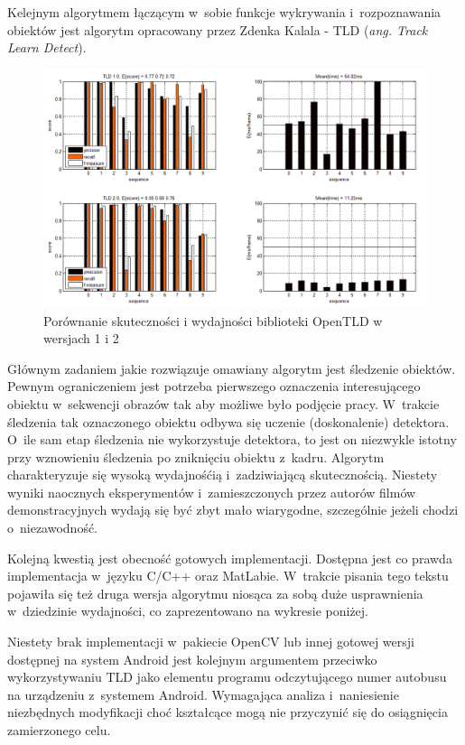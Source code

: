 Kelejnym algorytmem łączącym w~sobie funkcje wykrywania
i~rozpoznawania obiektów jest algorytm opracowany przez
Zdenka Kalala \cite{DBLP:journals/pami/KalalMM12} - TLD (\textit{ang.
Track Learn Detect}).

\begin{figure}[h!]
    \centering
    \includegraphics[width=1\textwidth]{img/rev_open_tld_1_2_comparison}
    \caption{Porównanie skuteczności i wydajności biblioteki OpenTLD w wersjach 1 i 2}
\end{figure}

Głównym zadaniem jakie rozwiązuje omawiany algorytm jest śledzenie obiektów.
Pewnym ograniczeniem jest potrzeba pierwszego oznaczenia interesującego
obiektu w~sekwencji obrazów tak aby możliwe było podjęcie pracy.
W~trakcie śledzenia tak oznaczonego obiektu odbywa się uczenie (doskonalenie)
detektora. O~ile sam etap śledzenia nie wykorzystuje detektora, to jest on
niezwykle istotny przy wznowieniu śledzenia po zniknięciu obiektu z~kadru.
Algorytm charakteryzuje się wysoką wydajnośćią i~zadziwiającą skutecznością.
Niestety wyniki naocznych eksperymentów i~zamieszczonych przez autorów filmów
demonstracyjnych wydają się być zbyt mało wiarygodne, szczególnie jeżeli
chodzi o~niezawodność.

Kolejną kwestią jest obecność gotowych implementacji.
Dostępna jest co prawda implementacja w~języku C/C++ oraz MatLabie. W~trakcie
pisania tego tekstu pojawiła się też druga wersja algorytmu niosąca
za sobą duże usprawnienia w~dziedzinie wydajności, co zaprezentowano
na wykresie poniżej.

Niestety brak implementacji w~pakiecie OpenCV lub
innej gotowej wersji dostępnej na system Android jest kolejnym
argumentem przeciwko wykorzystywaniu TLD jako elementu
programu odczytującego numer autobusu na urządzeniu z~systemem Android.
Wymagająca analiza i~naniesienie
niezbędnych modyfikacji
choć kształcące mogą nie przyczynić się do osiągnięcia zamierzonego celu.

